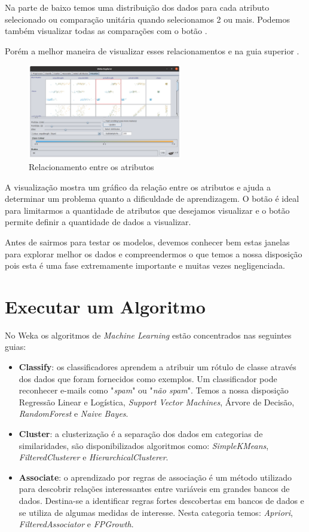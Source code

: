 \documentclass[a4paper,11pt]{article}
\begin{document}
Na parte de baixo temos uma distribuição dos dados para cada atributo selecionado ou comparação unitária quando selecionamos 2 ou mais. Podemos também visualizar todas as comparações com o botão .

Porém a melhor maneira de visualizar esses relacionamentos e na guia superior . 
\begin{figure}[H]
	\centering
	\includegraphics[width=0.6\textwidth]{imagem/visualize.png}
	\caption{Relacionamento entre os atributos}
\end{figure}

A visualização mostra um gráfico da relação entre os atributos e ajuda a determinar um problema quanto a dificuldade de aprendizagem. O botão  é ideal para limitarmos a quantidade de atributos que desejamos visualizar e o botão  permite definir a quantidade de dados a visualizar. 

Antes de sairmos para testar os modelos, devemos conhecer bem estas janelas para explorar melhor os dados e compreendermos o que temos a nossa disposição pois esta é uma fase extremamente importante e muitas vezes negligenciada.

\section{Executar um Algoritmo}
No Weka os algoritmos de \textit{Machine Learning} estão concentrados nas seguintes guias: \vspace{-1em}
\begin{itemize}
	\item \textbf{Classify}: os classificadores aprendem a atribuir um rótulo de classe através dos dados que foram fornecidos como exemplos. Um classificador pode reconhecer e-mails como "\textit{spam}" ou "\textit{não spam}". Temos a nossa disposição Regressão Linear e Logística, \textit{Support Vector Machines}, Árvore de Decisão, \textit{RandomForest} e \textit{Naive Bayes}.
	\item \textbf{Cluster}: a clusterização é a separação dos dados em categorias de similaridades, são disponibilizados algoritmos como: \textit{SimpleKMeans}, \textit{FilteredClusterer} e \textit{HierarchicalClusterer}.
	\item \textbf{Associate}: o aprendizado por regras de associação é um método utilizado para descobrir relações interessantes entre variáveis em grandes bancos de dados. Destina-se a identificar regras fortes descobertas em bancos de dados e se utiliza de algumas medidas de interesse. Nesta categoria temos: \textit{Apriori}, \textit{FilteredAssociator} e \textit{FPGrowth}.
\end{itemize}
\end{document}
